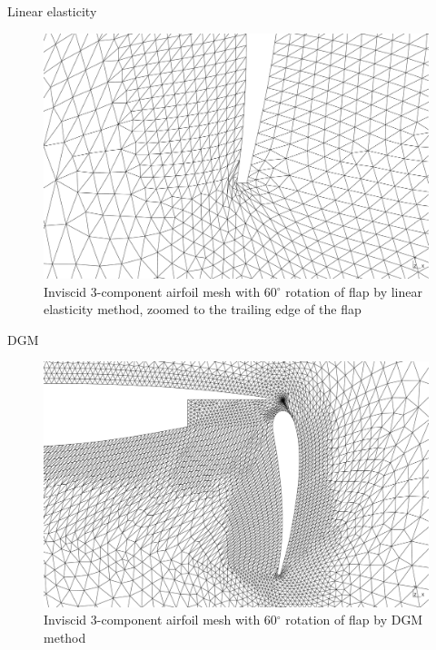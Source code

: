 \documentclass[t,12pt]{beamer}
\begin{document}
\begin{frame}{Linear elasticity}
	\begin{figure}[!h]
		\centering
		\includegraphics[scale=0.17]{wing60-linelastp1_zoomed2}
		\caption{Inviscid 3-component airfoil mesh with 60$^\circ$ rotation of flap by linear elasticity method, zoomed to the trailing edge of the flap}
		\label{fig:wing-inviscid-linelastp1-zoomed2}
	\end{figure}
\end{frame}
\begin{frame}{DGM}
	\begin{figure}[!h]
		\centering
		\includegraphics[scale=0.17]{wing60-dg-ms}
		\caption{Inviscid 3-component airfoil mesh with 60$^\circ$ rotation of flap by DGM method}
		\label{fig:wing-inviscid-dg-ms}
	\end{figure}
\end{frame}
\end{document}
